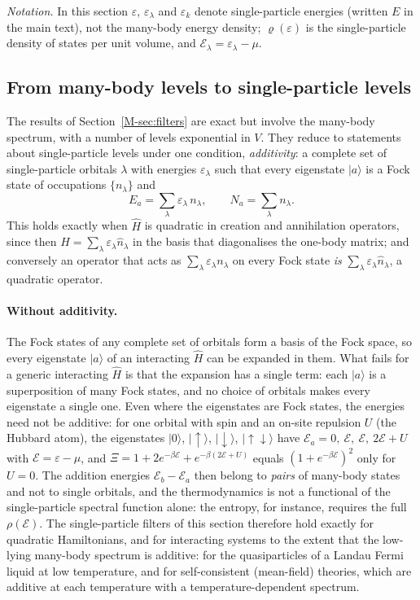 \documentclass[10pt,a4paper]{article}
\theoremstyle{plain}
\theoremstyle{remark}
\newcommand{\enrg}{\mathcal{E}}  %
\begin{document}
\emph{Notation.} In this section $\varepsilon$, $\varepsilon_\lambda$ and
$\varepsilon_k$ denote single-particle energies (written $E$ in the main
text), not the many-body energy density; $\varrho(\varepsilon)$ is the
single-particle density of states per unit volume, and
$\enrg_\lambda=\varepsilon_\lambda-\mu$.

\subsection{From many-body levels to single-particle levels}
\label{sec:filt_additive}

The results of Section~\ref{M-sec:filters} are exact but involve the many-body
spectrum, with a number of levels exponential in $ V $. They reduce to
statements about single-particle levels under one condition,
\emph{additivity}: a complete set of single-particle orbitals $ \lambda $
with energies $ \varepsilon_\lambda $ such that every eigenstate
$ |a\rangle $ is a Fock state of occupations $ \{n_\lambda\} $ and
\[
  E_a = \sum_\lambda \varepsilon_\lambda\,n_\lambda , \qquad N_a = \sum_\lambda n_\lambda .
\]
This holds exactly when $ \hat H $ is quadratic in creation and annihilation
operators, since then $ \hat H = \sum_\lambda\varepsilon_\lambda\hat n_\lambda $ in the
basis that diagonalises the one-body matrix; and conversely an operator that acts
as $ \sum_\lambda\varepsilon_\lambda n_\lambda $ on every Fock state \emph{is}
$ \sum_\lambda\varepsilon_\lambda\hat n_\lambda $, a quadratic operator.

\paragraph{Without additivity.} The Fock states of any complete set of orbitals
form a basis of the Fock space, so every eigenstate $|a\rangle$ of an
interacting $\hat H$ can be expanded in them. What fails for a generic
interacting $\hat H$ is that the expansion has a single term: each $|a\rangle$
is a superposition of many Fock states, and no choice of orbitals makes every
eigenstate a single one. Even where the eigenstates are Fock states, the
energies need not be additive: for one orbital with spin and an on-site
repulsion $U$ (the Hubbard atom), the eigenstates $|0\rangle$,
$|{\uparrow}\rangle$, $|{\downarrow}\rangle$, $|{\uparrow\downarrow}\rangle$
have $\enrg_a=0,\ \enrg,\ \enrg,\ 2\enrg+U$ with $\enrg=\varepsilon-\mu$, and
$\Xi=1+2e^{-\beta\enrg}+e^{-\beta(2\enrg+U)}$ equals $(1+e^{-\beta\enrg})^{2}$ only
for $U=0$. The addition energies $\enrg_b-\enrg_a$ then belong to \emph{pairs} of
many-body states and not to single orbitals, and the thermodynamics is not a
functional of the single-particle spectral function alone: the entropy, for
instance, requires the full $\rho(\enrg)$. The single-particle filters of this
section therefore hold exactly for quadratic Hamiltonians, and for
interacting systems to the extent that the low-lying many-body spectrum is
additive: for the quasiparticles of a Landau Fermi liquid at low
temperature, and for self-consistent (mean-field) theories, which are
additive at each temperature with a temperature-dependent spectrum.
\end{document}
